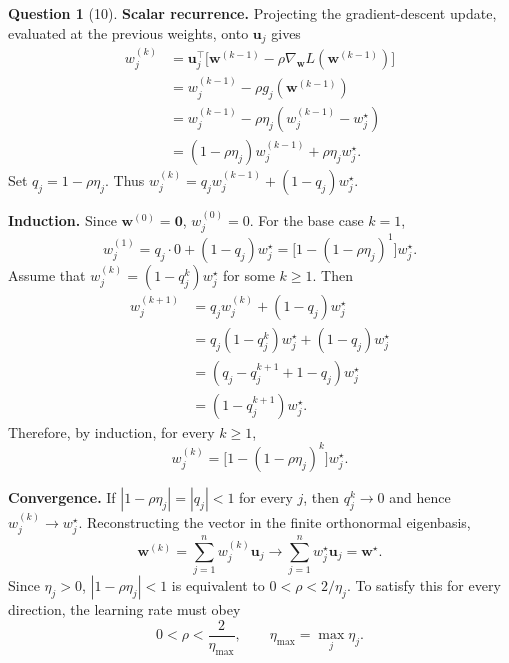 \documentclass[12pt]{article}
\theoremstyle{definition}
\newtheorem{exercise}{Question}%
\begin{document}
\begin{exercise}[10]
{\medskip
\textbf{Scalar recurrence.}
Projecting the gradient-descent update, evaluated at the previous weights,
onto $\mathbf u_j$ gives
\[
\begin{aligned}
w_j^{(k)}
&=\mathbf u_j^\top\bigl[\mathbf w^{(k-1)}
-\rho\nabla_{\mathbf w}L(\mathbf w^{(k-1)})\bigr]\\
&=w_j^{(k-1)}-\rho g_j(\mathbf w^{(k-1)})\\
&=w_j^{(k-1)}-\rho\eta_j(w_j^{(k-1)}-w_j^\star)\\
&=(1-\rho\eta_j)w_j^{(k-1)}+\rho\eta_jw_j^\star.
\end{aligned}
\]
Set $q_j=1-\rho\eta_j$. Thus
$w_j^{(k)}=q_jw_j^{(k-1)}+(1-q_j)w_j^\star$.

\medskip
\textbf{Induction.}
Since $\mathbf w^{(0)}=\mathbf0$, $w_j^{(0)}=0$.
For the base case $k=1$,
\[
w_j^{(1)}=q_j\cdot0+(1-q_j)w_j^\star
=\bigl[1-(1-\rho\eta_j)^1\bigr]w_j^\star.
\]
Assume that $w_j^{(k)}=(1-q_j^k)w_j^\star$ for some $k\geq1$.
Then
\[
\begin{aligned}
w_j^{(k+1)}
&=q_jw_j^{(k)}+(1-q_j)w_j^\star\\
&=q_j(1-q_j^k)w_j^\star+(1-q_j)w_j^\star\\
&=(q_j-q_j^{k+1}+1-q_j)w_j^\star\\
&=(1-q_j^{k+1})w_j^\star.
\end{aligned}
\]
Therefore, by induction, for every $k\geq1$,
\[
\boxed{w_j^{(k)}=\bigl[1-(1-\rho\eta_j)^k\bigr]w_j^\star}.
\]

\medskip
\textbf{Convergence.}
If $|1-\rho\eta_j|=|q_j|<1$ for every $j$, then $q_j^k\to0$
and hence $w_j^{(k)}\to w_j^\star$.
Reconstructing the vector in the finite orthonormal eigenbasis,
\[
\mathbf w^{(k)}=\sum_{j=1}^n w_j^{(k)}\mathbf u_j
\longrightarrow\sum_{j=1}^n w_j^\star\mathbf u_j
=\boxed{\mathbf w^\star}.
\]
Since $\eta_j>0$, $|1-\rho\eta_j|<1$ is equivalent to
$0<\rho<2/\eta_j$. To satisfy this for every direction, the learning rate
must obey
\[
\boxed{0<\rho<\frac{2}{\eta_{\max}}},
\qquad \eta_{\max}=\max_j\eta_j.
\]
}

\end{exercise}
\end{document}

